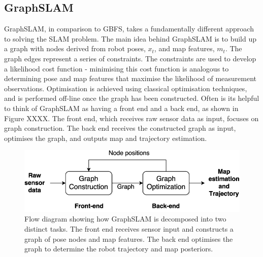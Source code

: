 \documentclass[a4paper]{article}
\begin{document}
\subsection{GraphSLAM}
GraphSLAM, in comparison to GBFS, takes a fundamentally different approach to solving the SLAM problem. The main idea behind GraphSLAM is to build up a graph with nodes derived from robot poses, $x_t$, and map features, $m_t$. The graph edges represent a series of constraints. The constraints are used to develop a likelihood cost function - minimising this cost function is analogous to determining pose and map features that maximise the likelihood of measurement observations. Optimisation is achieved using classical optimisation techniques, and is performed off-line once the graph has been constructed. Often is its helpful to think of GraphSLAM as having a front end and a back end, as shown in Figure XXXX. The front end, which receives raw sensor data as input, focuses on graph construction. The back end receives the constructed graph as input, optimises the graph, and outputs map and trajectory estimation.
\begin{figure}[h]
\centering
\includegraphics[scale=0.35]{Graph-SLAM-system}
\caption{Flow diagram showing how GraphSLAM is decomposed into two distinct tasks. The front end receives sensor input and constructs a graph of pose nodes and map features. The back end optimises the graph to determine the robot trajectory and map posteriors.}
\end{figure}
\end{document}
